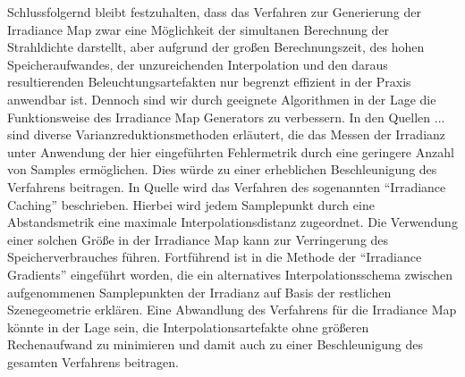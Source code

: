 	Schlussfolgernd bleibt festzuhalten, dass das Verfahren zur Generierung der Irradiance Map zwar eine Möglichkeit der simultanen Berechnung der Strahldichte darstellt, aber aufgrund der großen Berechnungszeit, des hohen Speicheraufwandes, der unzureichenden Interpolation und den daraus resultierenden Beleuchtungsartefakten nur begrenzt effizient in der Praxis anwendbar ist.
	Dennoch sind wir durch geeignete Algorithmen in der Lage die Funktionsweise des Irradiance Map Generators zu verbessern.
	In den Quellen ... sind diverse Varianzreduktionsmethoden erläutert, die das Messen der Irradianz unter Anwendung der hier eingeführten Fehlermetrik durch eine geringere Anzahl von Samples ermöglichen.
	Dies würde zu einer erheblichen Beschleunigung des Verfahrens beitragen.
	In Quelle \cite{pbrt2} wird das Verfahren des sogenannten \enquote{Irradiance Caching} beschrieben.
	Hierbei wird jedem Samplepunkt durch eine Abstandsmetrik eine maximale Interpolationsdistanz zugeordnet.
	Die Verwendung einer solchen Größe in der Irradiance Map kann zur Verringerung des Speicherverbrauches führen.
	Fortführend ist in \cite{irradiance-gradients} die Methode der \enquote{Irradiance Gradients} eingeführt worden, die ein alternatives Interpolationsschema zwischen aufgenommenen Samplepunkten der Irradianz auf Basis der restlichen Szenegeometrie erklären.
	Eine Abwandlung des Verfahrens für die Irradiance Map könnte in der Lage sein, die Interpolationsartefakte ohne größeren Rechenaufwand zu minimieren und damit auch zu einer Beschleunigung des gesamten Verfahrens beitragen.

